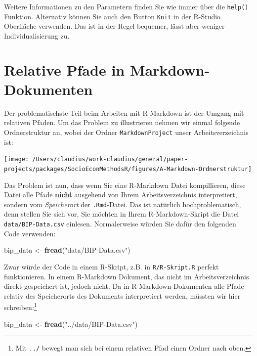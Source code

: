 \documentclass[]{book}
\newenvironment{Shaded}{\begin{snugshade}}{\end{snugshade}}
\newcommand{\KeywordTok}[1]{\textcolor[rgb]{0.13,0.29,0.53}{\textbf{#1}}}
\newcommand{\StringTok}[1]{\textcolor[rgb]{0.31,0.60,0.02}{#1}}
\newcommand{\NormalTok}[1]{#1}
\let\rmarkdownfootnote\footnote%
\def\footnote{\protect\rmarkdownfootnote}
\begin{document}
Weitere Informationen zu den Parametern finden Sie wie immer über die
\texttt{help()} Funktion. Alternativ können Sie auch den Button
\texttt{Knit} in der R-Studio Oberfläche verwenden. Das ist in der Regel
bequemer, lässt aber weniger Individualisierung zu.

\section{Relative Pfade in
Markdown-Dokumenten}\label{relative-pfade-in-markdown-dokumenten}

Der problematischste Teil beim Arbeiten mit R-Markdown ist der Umgang
mit relativen Pfaden. Um das Problem zu illustrieren nehmen wir einmal
folgende Ordnerstruktur an, wobei der Ordner \texttt{MarkdownProject}
unser Arbeitsverzeichnis ist:

\begin{center}\texttt{[image: /Users/claudius/work-claudius/general/paper-projects/packages/SocioEconMethodsR/figures/A-Markdown-Ordnerstruktur]} \end{center}

Das Problem ist nun, dass wenn Sie eine R-Markdown Datei kompillieren,
diese Datei alle Pfade \textbf{nicht} ausgehend von Ihrem
Arbeitsverzeichnis interpretiert, sondern vom \emph{Speicherort} der
\texttt{.Rmd}-Datei. Das ist natürlich hochproblematisch, denn stellen
Sie sich vor, Sie möchten in Ihrem R-Markdown-Skript die Datei
\texttt{data/BIP-Data.csv} einlesen. Normalerweise würden Sie dafür den
folgenden Code verwenden:

\begin{Shaded}
\begin{Highlighting}[]
\NormalTok{bip_data <-}\StringTok{ }\KeywordTok{fread}\NormalTok{(}\StringTok{"data/BIP-Data.csv"}\NormalTok{)}
\end{Highlighting}
\end{Shaded}

Zwar würde der Code in einem R-Skript, z.B. in \texttt{R/R-Skript.R}
perfekt funktionieren. In einem R-Markdown Dokument, das nicht im
Arbeitsverzeichnis direkt gespeichert ist, jedoch nicht. Da in
R-Markdown-Dokumenten alle Pfade relativ des Speicherorts des Dokuments
interpretiert werden, müssten wir hier schreiben:\footnote{Mit
  \texttt{../} bewegt man sich bei einem relativen Pfad einen Ordner
  nach oben.}

\begin{Shaded}
\begin{Highlighting}[]
\NormalTok{bip_data <-}\StringTok{ }\KeywordTok{fread}\NormalTok{(}\StringTok{"../data/BIP-Data.csv"}\NormalTok{)}
\end{Highlighting}
\end{Shaded}
\end{document}
